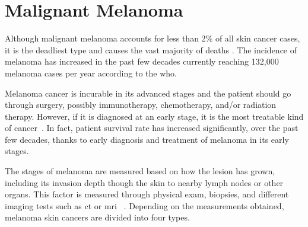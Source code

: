\section{Malignant Melanoma} \label{sec:chp1sec3}
Although malignant melanoma accounts for less than 2\% of all skin cancer cases, it is the deadliest type and causes the vast majority of deaths \cite{CancerFactsFigures2014}.
The incidence of melanoma has increased in the past few decades currently reaching 132,000 melanoma cases per year according to the \ac{who}. 

Melanoma cancer is incurable in its advanced stages and the patient should go through surgery, possibly immunotherapy, chemotherapy, and/or radiation therapy. 
However, if it is diagnosed at an early stage, it is the most treatable kind of cancer~\cite{CancerFactsFigures2014,forsea2012melanoma}.
In fact, patient survival rate has increased significantly, over the past few decades, thanks to early diagnosis and treatment of melanoma in its early stages. 

The stages of melanoma are measured based on how the lesion has grown, including its invasion depth though the skin to nearby lymph nodes or other organs.
This factor is measured through physical exam, biopsies, and different imaging tests such as \ac{ct} or \ac{mri} ~\cite{CancerFactsFigures2014}.
Depending on the measurements obtained, melanoma skin cancers are divided into four types.

